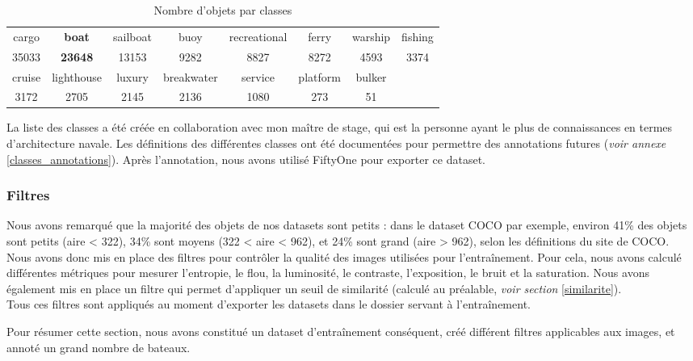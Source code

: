\begin{table}[!h]
    \caption{Nombre d'objets par classes}
    \begin{center}
    \begin{tabular}{c c c c c c c c}
    \hline
    cargo & \textbf{boat} & sailboat & buoy & recreational & ferry & warship & fishing \\
    35033 & \textbf{23648} & 13153 & 9282 & 8827 & 8272 & 4593 & 3374 \\

    \hline
    cruise & lighthouse & luxury & breakwater & service & platform & bulker \\
    3172 & 2705 & 2145 & 2136 & 1080 & 273 & 51
    \end{tabular}
    \end{center}
\end{table}

La liste des classes a été créée en collaboration avec mon maître de stage, qui est la personne ayant le plus de connaissances en termes d'architecture navale. 
Les définitions des différentes classes ont été documentées pour permettre
des annotations futures (\textit{voir annexe }\ref{classes_annotations}).
Après l'annotation, nous avons utilisé FiftyOne pour exporter ce dataset.

\subsubsection{Filtres}

Nous avons remarqué que la majorité des objets de nos datasets sont petits :
dans le dataset COCO par exemple, environ 41\% des objets sont petits (aire < 322),
34\% sont moyens (322 < aire < 962), et 24\% sont grand (aire > 962), selon les définitions du site de COCO.\\

Nous avons donc mis en place des filtres pour contrôler la qualité des images
utilisées pour l'entraînement. Pour cela, nous avons calculé différentes métriques
pour mesurer l'entropie, le flou, la luminosité, le contraste, l'exposition, le bruit et
la saturation. Nous avons également mis en place un filtre qui permet d'appliquer un seuil
de similarité (calculé au préalable, \textit{voir section }\ref{similarite}).\\

Tous ces filtres sont appliqués au moment d'exporter les datasets dans le dossier
servant à l'entraînement.

Pour résumer cette section, nous avons constitué un dataset d'entraînement conséquent, créé différent filtres applicables aux images, et annoté un grand nombre de bateaux.

